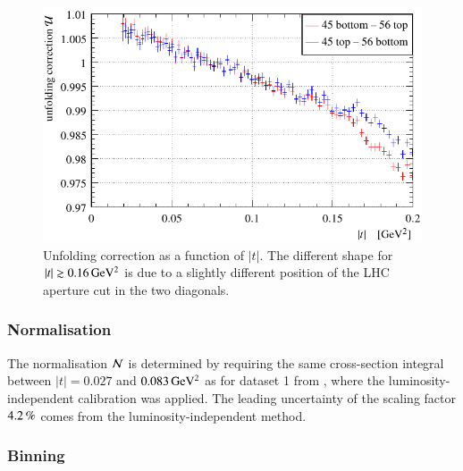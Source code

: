 \begin{figure}
\begin{center}
\includegraphics{fig/unfolding_correction_comparison.pdf}
\vskip-3mm
\caption{%
Unfolding correction as a function of $|t|$. The different shape for $|t| \gtrsim 0.16\,{\rm GeV^2}$ is due to a slightly different position of the LHC aperture cut in the two diagonals.
}
\label{fig:unfolding}
\end{center}
\end{figure}


\subsubsection{Normalisation}
\label{sec:normalisation}

The normalisation ${\cal N}$ is determined by requiring the same cross-section integral between $|t| = 0.027$ and $0.083\,{\rm GeV^2}$ as for dataset 1 from \cite{prl111}, where the luminosity-independent calibration was applied. The leading uncertainty of the scaling factor $4.2\,{\rm \%}$ comes from the luminosity-independent method.




\subsubsection{Binning}
\label{sec:binning}

